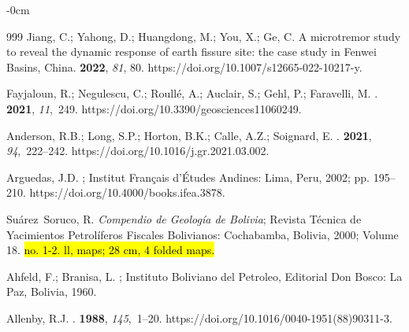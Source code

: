 \documentclass[data,article,accept,pdftex,moreauthors]{Definitions/mdpi}
\begin{document}
{\begin{adjustwidth}{-\extralength}{0cm}
\begin{thebibliography}{999}
Jiang, C.; Yahong, D.; Huangdong, M.; You, X.; Ge, C. {A microtremor study to reveal the dynamic response of earth fissure site: the case study in Fenwei Basins, China}.
 {\bf 2022}, {\em 81}, 80.
https://doi.org/10.1007/s12665-022-10217-y.

Fayjaloun, R.; Negulescu, C.; Roullé, A.; Auclair, S.; Gehl, P.; Faravelli, M.
.
 {\bf 2021}, {\em 11},~249.
https://doi.org/10.3390/geosciences11060249.

Anderson, R.B.; Long, S.P.; Horton, B.K.; Calle, A.Z.; Soignard, E.
.
 {\bf 2021}, {\em 94},~222--242.
https://doi.org/10.1016/j.gr.2021.03.002.

Arguedas, J.D.
; Institut Français d'\'Etudes Andines: Lima, Peru, 2002; pp. 195--210.
https://doi.org/10.4000/books.ifea.3878.


Suárez~Soruco, R. \emph{Compendio de Geología de Bolivia}; Revista Técnica de Yacimientos Petrolíferos Fiscales Bolivianos: Cochabamba, Bolivia, 2000; Volume 18. \hl{no. 1-2. ll, maps; 28 cm, 4 folded maps.} %

Ahfeld, F.; Branisa, L.
; Instituto Boliviano del Petroleo,
 Editorial Don Bosco: La Paz, Bolivia, 1960.

Allenby, R.J.
.
 {\bf 1988}, {\em 145},~1--20.
https://doi.org/10.1016/0040-1951(88)90311-3.


\end{thebibliography}
\end{adjustwidth}}
\end{document}
